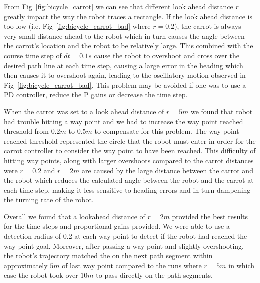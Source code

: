 \documentclass{article}
\begin{document}
From Fig~\ref{fig:bicycle_carrot} we can see that different look ahead distance $r$ greatly impact the way the robot traces a rectangle. If the look ahead distance is too low (i.e. Fig~\ref{fig:bicycle_carrot_bad} where $r = 0.2$), the carrot is always very small distance ahead to the robot which in turn causes the angle between the carrot's location and the robot to be relatively large. This combined with the course time step of $dt = 0.1s$ cause the robot to overshoot and cross over the desired path line at each time step, causing a large error in the heading which then causes it to overshoot again, leading to the oscillatory motion observed in Fig~\ref{fig:bicycle_carrot_bad}. This problem may be avoided if one was to use a PD controller, reduce the P gains or decrease the time step. 

When the carrot was set to a look ahead distance of $r = 5m$ we found that robot had trouble hitting a way point and we had to increase the way point reached threshold from $0.2 m $ to $0.5m$ to compensate for this problem. The way point reached threshold represented the circle that the robot must enter in order for the carrot controller to consider the way point to have been reached. This difficulty of hitting way points, along with larger overshoots compared to the carrot distances were $r= 0.2$ and $r = 2m$ are caused by the large distance between the carrot and the robot which reduces the calculated angle between the robot and the carrot at each time step, making it less sensitive to heading errors and in turn dampening the turning rate of the robot. 

Overall we found that a lookahead distance of $r = 2m$ provided the best results for the time steps and proportional gains provided. We were able to use a detection radius of 0.2 at each way point to detect if the robot had reached the way point goal. Moreover, after passing a way point and slightly overshooting, the robot's trajectory matched the on the next path segment within approximately $5m$ of last way point compared to the runs where $r = 5m$ in which case the robot took over $10m$ to pass directly on the path segments. 
\end{document}

